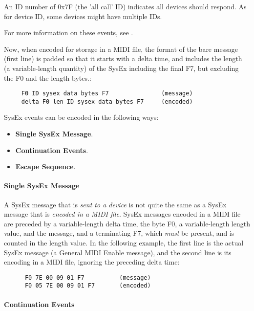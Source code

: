    An ID number of 0x7F (the 'all call' ID) indicates all devices should
   respond. As for device ID, some devices might have multiple IDs.

   For more information on these events, see
   .

   Now, when encoded for storage in a MIDI file, the format of the bare message
   (first line) is padded so that it starts with a delta time, and includes the
   length (a variable-length quantity) of the SysEx including the final F7, but
   excluding the F0 and the length bytes.:

   \begin{verbatim}
     F0 ID sysex data bytes F7               (message)
     delta F0 len ID sysex data bytes F7     (encoded)
   \end{verbatim}

   SysEx events can be encoded in the following ways:

   \begin{itemize}
      \item \textbf{Single SysEx Message}.
      \item \textbf{Continuation Events}.
      \item \textbf{Escape Sequence}.
   \end{itemize}

\paragraph{Single SysEx Message}
\label{paragraph:patterns_single_sysex_message}

   A SysEx message that is \textsl{sent to a device} is not quite the 
   same as a SysEx message that is \textsl{encoded in a MIDI file}.
   SysEx messages encoded in a MIDI file
   are preceded by a variable-length delta time, the byte F0,
   a variable-length length value, and the message, and a terminating F7,
   which \textsl{must} be present, and is counted in the length value.
   In the following example, the first line is the actual SysEx message
   (a General MIDI Enable message),
   and the second line is its encoding in a MIDI file, ignoring the preceding
   delta time:

   \begin{verbatim}
      F0 7E 00 09 01 F7          (message)
      F0 05 7E 00 09 01 F7       (encoded)
   \end{verbatim}

\paragraph{Continuation Events}
\label{paragraph:patterns_continuation_events}

